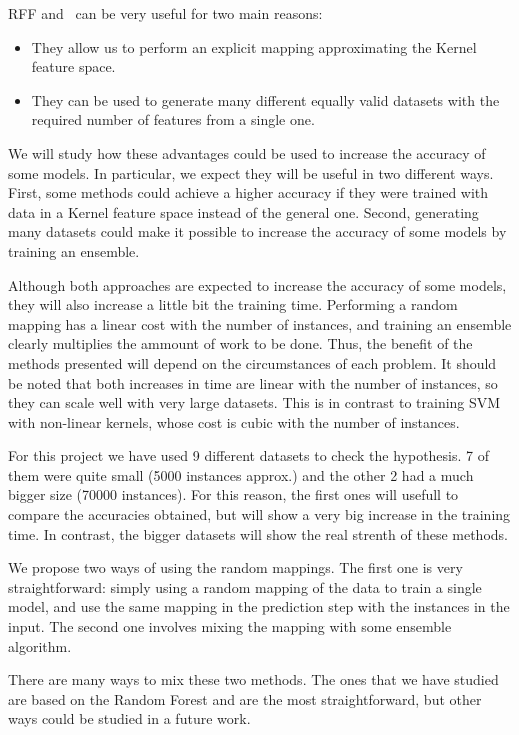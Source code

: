\begin{pre-delivery}
  RFF and \Nys\ can be very useful for two main reasons:
  \begin{itemize}
    \item They allow us to perform an explicit mapping approximating the Kernel
    feature space.
    \item They can be used to generate many different equally valid datasets
    with the required number of features from a single one.
  \end{itemize}

  We will study how these advantages could be used to increase the accuracy
  of some models. In particular, we expect they will be useful in two
  different ways. First, some methods could achieve a higher accuracy if they
  were trained with data in a Kernel feature space instead of the general
  one. Second, generating many datasets could make it possible to increase the
  accuracy of some models by training an ensemble.

  Although both approaches are expected to increase the accuracy of some
  models, they will also increase a little bit the training time. Performing
  a random mapping has a linear cost with the number of instances, and training
  an ensemble clearly multiplies the ammount of work to be done. Thus, the
  benefit of the methods presented will depend on the circumstances of
  each problem. It should be noted that both increases in time are linear with the
  number of instances, so they can scale well with very large datasets. This is
  in contrast to training SVM with non-linear kernels, whose cost is cubic
  with the number of instances.

  For this project we have used 9 different datasets to check the hypothesis. 7
  of them were quite small (5000 instances approx.) and the other 2 had a much
  bigger size (70000 instances). For this reason, the first ones will usefull
  to compare the accuracies obtained, but will show a very big increase in the
  training time. In contrast, the bigger datasets will show the real strenth
  of these methods.

  We propose two ways of using the random mappings. The first one is very
  straightforward: simply using a random mapping of the data to train a
  single model, and use the same mapping in the prediction step with
  the instances in the input. The second one involves mixing the mapping
  with some ensemble algorithm.

  There are many ways to mix these two methods. The ones that we have studied
  are based on the Random Forest and are the most straightforward, but other
  ways could be studied in a future work.


\end{pre-delivery}
